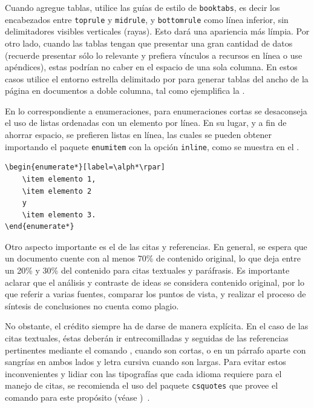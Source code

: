 \documentclass[letterpaper,10.5pt,twocolumn]{article}
\begin{document}
Cuando agregue tablas, utilice las guías de estilo de \texttt{booktabs}, es decir los encabezados entre \texttt{toprule} y \texttt{midrule}, y \texttt{bottomrule} como línea inferior, sin delimitadores visibles verticales (rayas). Esto dará una apariencia más límpia.
Por otro lado, cuando las tablas tengan que presentar una gran cantidad de datos (recuerde presentar sólo lo relevante y prefiera vínculos a recursos en línea o use apéndices), estas podrían no caber en el espacio de una sola columna.
En estos casos utilice el entorno estrella delimitado por  para generar tablas del ancho de la página en documentos a doble columna, tal como ejemplifica la .

En lo correspondiente a enumeraciones, para enumeraciones cortas se desaconseja el uso de listas ordenadas con un elemento por línea. En su lugar, y a fin de ahorrar espacio, se prefieren listas en línea, las cuales se pueden obtener importando el paquete \texttt{enumitem} con la opción \texttt{inline}, como se muestra en el .

\begin{lstlisting}[language={[LaTex]{TeX}},label={lst:inline-enum},caption={Enumeración en línea},captionpos=t]
\begin{enumerate*}[label=\alph*\rpar]
	\item elemento 1,
	\item elemento 2
	y
	\item elemento 3.
\end{enumerate*}
\end{lstlisting}

Otro aspecto importante es el de las citas y referencias.
En general, se espera que un documento cuente con al menos 70\% de contenido original, lo que deja entre un 20\% y 30\% del contenido para citas textuales y paráfrasis.
Es importante aclarar que el análisis y contraste de ideas se considera contenido original, por lo que referir a varias fuentes, comparar los puntos de vista, y realizar el proceso de síntesis de conclusiones no cuenta como plagio.

No obstante, el crédito siempre ha de darse de manera explícita.
En el caso de las citas textuales, éstas deberán ir entrecomilladas y seguidas de las referencias pertinentes mediante el comando , cuando son cortas, o en un párrafo aparte con sangrías en ambos lados y letra cursiva cuando son largas.
Para evitar estos inconvenientes y lidiar con las tipografías que cada idioma requiere para el manejo de citas, se recomienda el uso del paquete \texttt{csquotes} que provee el comando  para este propósito (véase )~.
\end{document}
